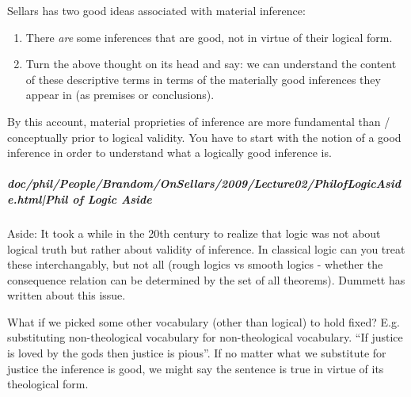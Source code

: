 \documentclass[12pt,a4paper]{report}
\begin{document}
Sellars has two good ideas associated with material inference:
\begin{enumerate}
\item There \emph{are} some inferences that are good, not in virtue of their logical form.
\item Turn the above thought on its head and say: we can understand the content of these descriptive terms in terms of the materially good inferences they appear in (as premises or conclusions).
\end{enumerate}


By this account, material proprieties of inference are more fundamental than / conceptually prior to logical validity. You have to start with the notion of a good inference in order to understand what a logically good inference is.

\subparagraph{doc/phil/People/Brandom/OnSellars/2009/Lecture02/PhilofLogicAside.html|Phil of Logic Aside}

Aside: It took a while in the 20th century to realize that logic was not about
logical truth but rather about validity of inference. In classical logic can
you treat these interchangably, but not all (rough logics vs smooth logics -
whether the consequence relation can be determined by the set of all theorems).
Dummett has written about this issue.

What if we picked some other vocabulary (other than logical) to hold fixed? E.g.
substituting non-theological vocabulary for non-theological vocabulary.
``If justice is loved by the gods then justice is pious''. If no matter what we
substitute for justice the inference is good, we might say the sentence is true
in virtue of its theological form.
\end{document}
